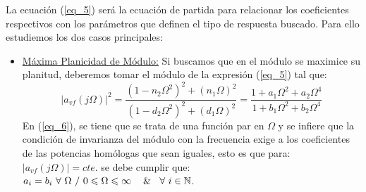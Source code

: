 \documentclass[12pt,a4paper]{article}
\begin{document}
La ecuación (\ref{eq_5}) será la ecuación de partida para relacionar los coeficientes respectivos con los parámetros que definen el tipo de respuesta buscado. Para ello estudiemos los dos casos principales:

\begin{itemize}
    \item \underline{Máxima Planicidad de Módulo:} Si buscamos que en el módulo se maximice su planitud, deberemos tomar el módulo de la expresión (\ref{eq_5}) tal que:
    \begin{equation}
        \label{eq_6}
        |a_{vf}(j\Omega)|^2 = \frac{(1 - n_2 \Omega^2)^2 + (n_1 \Omega)^2}{(1 - d_2 \Omega^2)^2 + (d_1 \Omega)^2} = \frac{1 + a_1\Omega^2 + a_2\Omega^4}{1 + b_1\Omega^2 + b_2\Omega^4}
    \end{equation}
    En (\ref{eq_6}), se tiene que se trata de una función par en $\Omega$ y se infiere que la condición de invarianza del módulo con la frecuencia exige a los coeficientes de las potencias homólogas que sean iguales, esto es que para: $|a_{vf}(j\Omega)| = cte.$ se debe cumplir que: $a_{i} = b_{i} \ \forall \ \Omega \ / \ 0 \leqslant \Omega \leqslant \infty\ \ \And \ \forall \ i\in \mathbb{N}$.
    

\end{itemize}
\end{document}
